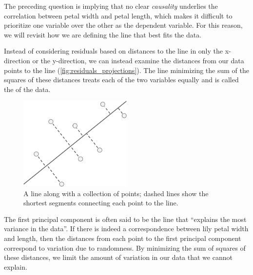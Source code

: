 \begin{note}\end{note}

\fudgespace

\begin{qbox}\end{qbox}

The preceding question is implying that no clear \textit{causality} underlies the correlation between petal width and petal length, which makes it difficult to prioritize one variable over the other as the dependent variable. For this reason, we will revisit how we are defining the line that best fits the data.

Instead of considering residuals based on distances to the line in only the x-direction or the y-direction, we can instead examine the distances from our data points to the line (\autoref{fig:residuals_projections}). The line minimizing the sum of the squares of these distances treats each of the two variables equally and is called the  of the data.\\

\begin{figure}[h]
\centering
\mySfFamily
\includegraphics[width = 0.5\textwidth]{../images/residuals_projections.png}
\caption{A line along with a collection of points; dashed lines show the shortest segments connecting each point to the line.}
\label{fig:residuals_projections}
\end{figure}

The first principal component is often said to be the line that ``explains the most variance in the data''. If there is indeed a correspondence between lily petal width and length, then the distances from each point to the first principal component correspond to variation due to randomness. By minimizing the sum of squares of these distances, we limit the amount of variation in our data that we cannot explain.

